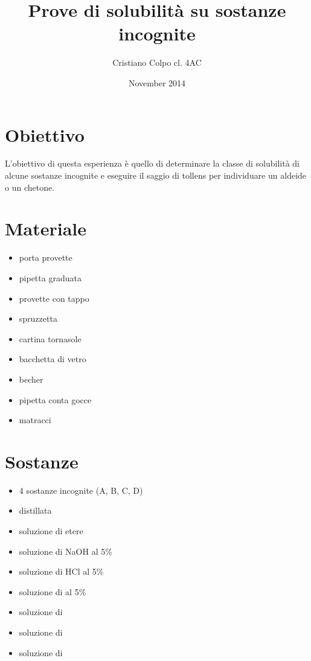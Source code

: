 \documentclass{article}
\title{Prove di solubilità su sostanze incognite}
\author{Cristiano Colpo cl. 4AC}
\date{November 2014}
\begin{document}
\maketitle

\section{Obiettivo}
L'obiettivo di questa esperienza è quello di determinare la classe di solubilità di alcune sostanze incognite e eseguire il saggio di tollens per individuare un aldeide o un chetone. 

\section{Materiale}
\begin{multicols}{2}
\renewcommand{\labelitemi}{$\square$}
\begin{itemize}
    \item porta provette
    \item pipetta graduata
    \item provette con tappo
    \item spruzzetta
    \item cartina tornasole
    \item bacchetta di vetro
    \item becher
    \item pipetta conta gocce
    \item matracci
\end{itemize}
\end{multicols}

\section{Sostanze}
\begin{multicols}{2}
\renewcommand{\labelitemi}{$\square$}
\begin{itemize}
    \item 4 sostanze incognite (A, B, C, D)
    \item {} distillata
    \item soluzione di etere
    \item soluzione di NaOH al 5\%
    \item soluzione di HCl al 5\%
    \item soluzione di  al 5\%
    \item soluzione di 
    \item soluzione di 
    \item soluzione di 
\end{itemize}
\end{multicols}
\end{document}
